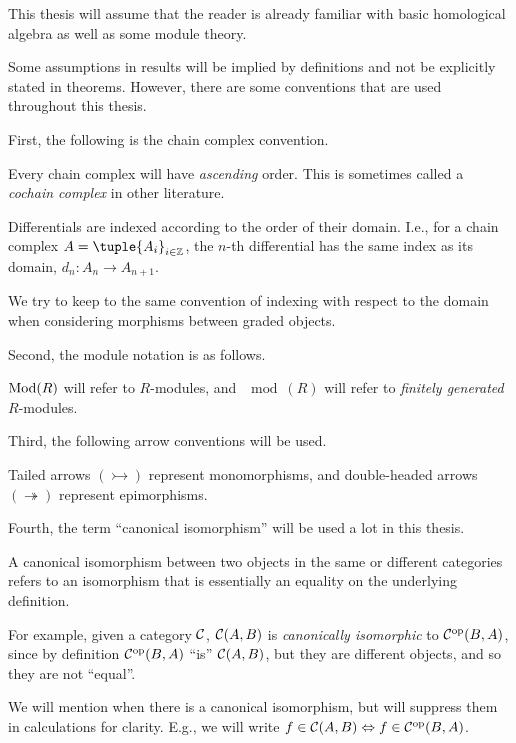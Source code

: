 This thesis will assume that the reader is already familiar with basic homological algebra as well as some module theory.

Some assumptions in results will be implied by definitions and not be explicitly stated in theorems. However, there are some conventions that are used throughout this thesis.

First, the following is the chain complex convention.
\begin{notation}
    \label{not:chain_complex}
    Every chain complex will have \emph{ascending} order. This is sometimes called a \emph{cochain complex} in other literature.

    Differentials are indexed according to the order of their domain. I.e., for a chain complex \( A = \tuple{A_i}_{i \in \Zb} \), the \( n \)-th differential has the same index as its domain, \( d_n: A_n \to A_{n + 1} \).
    
    We try to keep to the same convention of indexing with respect to the domain when considering morphisms between graded objects.
\end{notation}

Second, the module notation is as follows.
\begin{notation}
    \( \operatorname{Mod}(R) \) will refer to \( R \)-modules, and \( \mod(R) \) will refer to \emph{finitely generated} \( R \)-modules.
\end{notation}

Third, the following arrow conventions will be used.
\begin{notation}
    Tailed arrows \( (\rightarrowtail) \) represent monomorphisms, and double-headed arrows \( (\twoheadrightarrow) \) represent epimorphisms.
\end{notation}

Fourth, the term ``canonical isomorphism'' will be used a lot in this thesis.
\begin{notation}
    A canonical isomorphism between two objects in the same or different categories refers to an isomorphism that is essentially an equality on the underlying definition.

    For example, given a category \( {\mathcal{C}} \), \( {\mathcal{C}}(A, B) \) is \emph{canonically isomorphic} to \( {\mathcal{C}}^{\operatorname{op}}(B, A) \), since by definition \( {\mathcal{C}}^{\operatorname{op}}(B, A) \) ``is'' \( {\mathcal{C}}(A, B) \), but they are different objects, and so they are not ``equal''.

    We will mention when there is a canonical isomorphism, but will suppress them in calculations for clarity. E.g., we will write \( f \in {\mathcal{C}}(A, B) \Leftrightarrow f \in {\mathcal{C}}^{\operatorname{op}}(B, A) \).
\end{notation}


